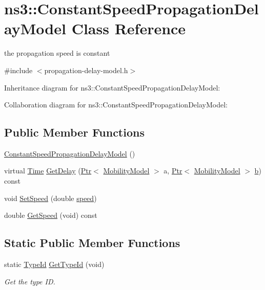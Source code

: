 \hypertarget{classns3_1_1ConstantSpeedPropagationDelayModel}{}\section{ns3\+:\+:Constant\+Speed\+Propagation\+Delay\+Model Class Reference}
\label{classns3_1_1ConstantSpeedPropagationDelayModel}


the propagation speed is constant  




{\ttfamily \#include $<$propagation-\/delay-\/model.\+h$>$}



Inheritance diagram for ns3\+:\+:Constant\+Speed\+Propagation\+Delay\+Model\+:


Collaboration diagram for ns3\+:\+:Constant\+Speed\+Propagation\+Delay\+Model\+:
\subsection*{Public Member Functions}
\begin{DoxyCompactItemize}
\item 
\hyperlink{classns3_1_1ConstantSpeedPropagationDelayModel_ab2616d2ea06f18fc01573a38d0f85c2e}{Constant\+Speed\+Propagation\+Delay\+Model} ()
\item 
virtual \hyperlink{classns3_1_1Time}{Time} \hyperlink{classns3_1_1ConstantSpeedPropagationDelayModel_a02fbbd68ce99f0850f19f546ea682f8b}{Get\+Delay} (\hyperlink{classns3_1_1Ptr}{Ptr}$<$ \hyperlink{classns3_1_1MobilityModel}{Mobility\+Model} $>$ a, \hyperlink{classns3_1_1Ptr}{Ptr}$<$ \hyperlink{classns3_1_1MobilityModel}{Mobility\+Model} $>$ \hyperlink{lte__pathloss_8m_a21ad0bd836b90d08f4cf640b4c298e7c}{b}) const 
\item 
void \hyperlink{classns3_1_1ConstantSpeedPropagationDelayModel_a98a6995314359acb3fb675febccb4dee}{Set\+Speed} (double \hyperlink{mmwave-amc-test_8cc_a6dc6e6f3c75c509ce943163afb5dade7}{speed})
\item 
double \hyperlink{classns3_1_1ConstantSpeedPropagationDelayModel_a5c3f222a5e97c7dbfbd7f5eb1ec229a9}{Get\+Speed} (void) const 
\end{DoxyCompactItemize}
\subsection*{Static Public Member Functions}
\begin{DoxyCompactItemize}
\item 
static \hyperlink{classns3_1_1TypeId}{Type\+Id} \hyperlink{classns3_1_1ConstantSpeedPropagationDelayModel_a78c5b41e9ff4d99f0dc7b149d8661612}{Get\+Type\+Id} (void)
\begin{DoxyCompactList}\small\item\em Get the type ID. \end{DoxyCompactList}\end{DoxyCompactItemize}
